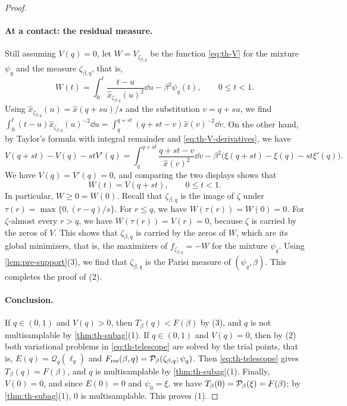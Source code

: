 \begin{proof}
\paragraph{At a contact: the residual measure.}
Still assuming $V(q)=0$, let $W=V_{\zeta_{\beta,q}}$ be the function \eqref{eq:th-V} for the mixture $\psi_q$ and the measure $\zeta_{\beta,q}$, that is,
\[
W(t)=\int_0^t\frac{t-u}{\hat x_{\zeta_{\beta,q}}(u)^2}\dd u-\beta^2\psi_q(t),\qquad 0\le t<1.
\]
Using $\hat x_{\zeta_{\beta,q}}(u)=\hat x(q+su)/s$ and the substitution $v=q+su$, we find $\int_0^t(t-u)\hat x_{\zeta_{\beta,q}}(u)^{-2}\dd u=\int_q^{q+st}(q+st-v)\hat x(v)^{-2}\dd v$. On the other hand, by Taylor's formula with integral remainder and \eqref{eq:th-V-derivatives}, we have
\[
V(q+st)-V(q)-stV'(q)=\int_q^{q+st}\frac{q+st-v}{\hat x(v)^2}\dd v-\beta^2\big(\xi(q+st)-\xi(q)-st\xi'(q)\big).
\]
We have $V(q)=V'(q)=0$, and comparing the two displays shows that
\begin{equation}\label{eq:th-residual-potential}
W(t)=V(q+st),\qquad 0\le t<1.
\end{equation}
In particular, $W\ge0=W(0)$. Recall that $\zeta_{\beta,q}$ is the image of $\zeta$ under $\tau(r)=\max\{0,(r-q)/s\}$. For $r\le q$, we have $W(\tau(r))=W(0)=0$. For $\zeta$-almost every $r>q$, we have $W(\tau(r))=V(r)=0$, because $\zeta$ is carried by the zeros of $V$. This shows that $\zeta_{\beta,q}$ is carried by the zeros of $W$, which are its global minimizers, that is, the maximizers of $f_{\zeta_{\beta,q}}=-W$ for the mixture $\psi_q$. Using \cref{lem:pre-support}(3), we find that $\zeta_{\beta,q}$ is the Parisi measure of $(\psi_q,\beta)$. This completes the proof of (2).

\paragraph{Conclusion.}
If $q\in(0,1)$ and $V(q)>0$, then $T_\beta(q)<F(\beta)$ by (3), and $q$ is not multisamplable by \cref{thm:th-subag}(1). If $q\in(0,1)$ and $V(q)=0$, then by (2) both variational problems in \eqref{eq:th-telescope} are solved by the trial points, that is, $E(q)=\mathcal Q_q(\ell_q)$ and $F_{\rm res}(\beta,q)=\mathcal P_\beta(\zeta_{\beta,q};\psi_q)$. Then \eqref{eq:th-telescope} gives $T_\beta(q)=F(\beta)$, and $q$ is multisamplable by \cref{thm:th-subag}(1). Finally, $V(0)=0$, and since $E(0)=0$ and $\psi_0=\xi$, we have $T_\beta(0)=\mathcal P_\beta(\xi)=F(\beta)$; by \cref{thm:th-subag}(1), $0$ is multisamplable. This proves (1).
\end{proof}

